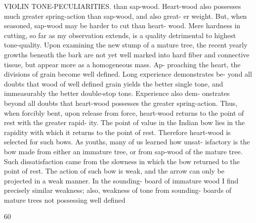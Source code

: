 \documentclass{article}
\begin{document}
VIOLIN TONE-PECULIARITIES. than sap-wood. Heart-wood also possesses much greater spring-action than sap-wood, and also great- er weight. But, when seasoned, sap-wood may be harder to cut than heart- wood. Mere hardness in cutting, so far as my observation extends, is a quality detrimental to highest tone-quality. Upon examining the new stump of a mature tree, the recent yearly growths beneath the bark are not yet well marked into hard fiber and connective tissue, but appear more as a homogeneous mass. Ap- proaching the heart, the divisions of grain become well defined. Long experience demonstrates be- yond all doubts that wood of well defined grain yields the better single tone, and immeasurably the better double-stop tone. Experience also dem- onstrates beyond all doubts that heart-wood possesses the greater spring-action. Thus, when forcibly bent, upon release from force, heart-wood returns to the point of rest with the greater rapid- ity. The point of value in the Indian bow lies in the rapidity with which it returns to the point of rest. Therefore heart-wood is selected for such bows. As youths, many of us learned how unsat- isfactory is the bow made from either an immature tree, or from sap-wood of the mature tree. Such dissatisfaction came from the slowness in which the bow returned to the point of rest. The action of such bow is weak, and the arrow can only be projected in a weak manner. In the sounding- board of immature wood I find precisely similar weakness; also, weakness of tone from sounding- boards of mature trees not possessing well defined

60
\end{document}
